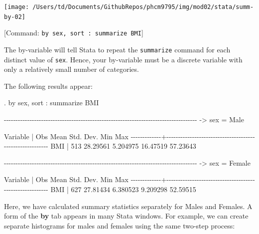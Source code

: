 \documentclass[
]{memoir}
\newenvironment{Shaded}{\begin{snugshade}}{\end{snugshade}}
\newcommand{\NormalTok}[1]{#1}
\begin{document}
\texttt{[image: /Users/td/Documents/GithubRepos/phcm9795/img/mod02/stata/summ-by-02]}

{[}Command: \texttt{by\ sex,\ sort\ :\ summarize\ BMI}{]}

The by-variable will tell Stata to repeat the \texttt{summarize} command for each distinct value of \texttt{sex}. Hence, your by-variable must be a discrete variable with only a relatively small number of categories.

The following results appear:

\begin{Shaded}
\begin{Highlighting}[]
\NormalTok{. by sex, sort : summarize BMI}

\NormalTok{{-}{-}{-}{-}{-}{-}{-}{-}{-}{-}{-}{-}{-}{-}{-}{-}{-}{-}{-}{-}{-}{-}{-}{-}{-}{-}{-}{-}{-}{-}{-}{-}{-}{-}{-}{-}{-}{-}{-}{-}{-}{-}{-}{-}{-}{-}{-}{-}{-}{-}{-}{-}{-}{-}{-}{-}{-}{-}{-}{-}{-}{-}{-}{-}{-}{-}{-}{-}{-}{-}{-}{-}{-}{-}{-}{-}{-}{-}{-}{-}{-}{-}{-}}
\NormalTok{{-}\textgreater{} sex = Male}

\NormalTok{    Variable |        Obs        Mean    Std. Dev.       Min        Max}
\NormalTok{{-}{-}{-}{-}{-}{-}{-}{-}{-}{-}{-}{-}{-}+{-}{-}{-}{-}{-}{-}{-}{-}{-}{-}{-}{-}{-}{-}{-}{-}{-}{-}{-}{-}{-}{-}{-}{-}{-}{-}{-}{-}{-}{-}{-}{-}{-}{-}{-}{-}{-}{-}{-}{-}{-}{-}{-}{-}{-}{-}{-}{-}{-}{-}{-}{-}{-}{-}{-}{-}{-}}
\NormalTok{         BMI |        513    28.29561    5.204975   16.47519   57.23643}

\NormalTok{{-}{-}{-}{-}{-}{-}{-}{-}{-}{-}{-}{-}{-}{-}{-}{-}{-}{-}{-}{-}{-}{-}{-}{-}{-}{-}{-}{-}{-}{-}{-}{-}{-}{-}{-}{-}{-}{-}{-}{-}{-}{-}{-}{-}{-}{-}{-}{-}{-}{-}{-}{-}{-}{-}{-}{-}{-}{-}{-}{-}{-}{-}{-}{-}{-}{-}{-}{-}{-}{-}{-}{-}{-}{-}{-}{-}{-}{-}{-}{-}{-}{-}{-}}
\NormalTok{{-}\textgreater{} sex = Female}

\NormalTok{    Variable |        Obs        Mean    Std. Dev.       Min        Max}
\NormalTok{{-}{-}{-}{-}{-}{-}{-}{-}{-}{-}{-}{-}{-}+{-}{-}{-}{-}{-}{-}{-}{-}{-}{-}{-}{-}{-}{-}{-}{-}{-}{-}{-}{-}{-}{-}{-}{-}{-}{-}{-}{-}{-}{-}{-}{-}{-}{-}{-}{-}{-}{-}{-}{-}{-}{-}{-}{-}{-}{-}{-}{-}{-}{-}{-}{-}{-}{-}{-}{-}{-}}
\NormalTok{         BMI |        627    27.81434    6.380523   9.209298   52.59515}
\end{Highlighting}
\end{Shaded}

Here, we have calculated summary statistics separately for Males and Females.
A form of the \textbf{by} tab appears in many Stata windows. For example, we can create separate histograms for males and females using the same two-step process:
\end{document}
